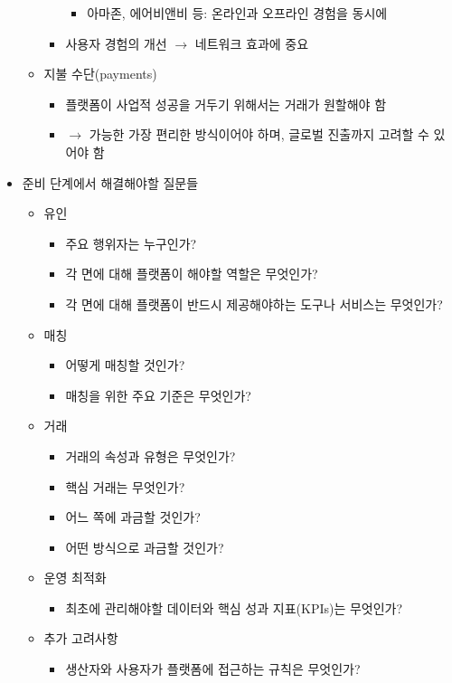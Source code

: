 \begin{itemize}
\begin{itemize}
\begin{itemize}
\begin{itemize}
			\item 아마존, 에어비앤비 등: 온라인과 오프라인 경험을 동시에
			\end{itemize}
		\item 사용자 경험의 개선 $\rightarrow$ 네트워크 효과에 중요
		\end{itemize}
	\item 지불 수단(payments)
		\begin{itemize}
		\item 플랫폼이 사업적 성공을 거두기 위해서는 거래가 원할해야 함
		\item $\rightarrow$ 가능한 가장 편리한 방식이어야 하며, 글로벌 진출까지 고려할 수 있어야 함
		\end{itemize}
	\end{itemize}
\item 준비 단계에서 해결해야할 질문들 \cite[ch. 7]{Reillier:2017tt}
	\begin{itemize}
	\item 유인
		\begin{itemize}
		\item 주요 행위자는 누구인가?
		\item 각 면에 대해 플랫폼이 해야할 역할은 무엇인가?
		\item 각 면에 대해 플랫폼이 반드시 제공해야하는 도구나 서비스는 무엇인가?
		\end{itemize}
	\item 매칭
		\begin{itemize}
		\item 어떻게 매칭할 것인가?
		\item 매칭을 위한 주요 기준은 무엇인가?
		\end{itemize}	
	\item 거래
		\begin{itemize}
		\item 거래의 속성과 유형은 무엇인가?
		\item 핵심 거래는 무엇인가?
		\item 어느 쪽에 과금할 것인가?
		\item 어떤 방식으로 과금할 것인가?
		\end{itemize}	
	\item 운영 최적화	
		\begin{itemize}
		\item 최초에 관리해야할 데이터와 핵심 성과 지표(KPIs)는 무엇인가?
		\end{itemize}	
	\item 추가 고려사항
		\begin{itemize}
		\item 생산자와 사용자가 플랫폼에 접근하는 규칙은 무엇인가?

\end{itemize}
\end{itemize}
\end{itemize}
